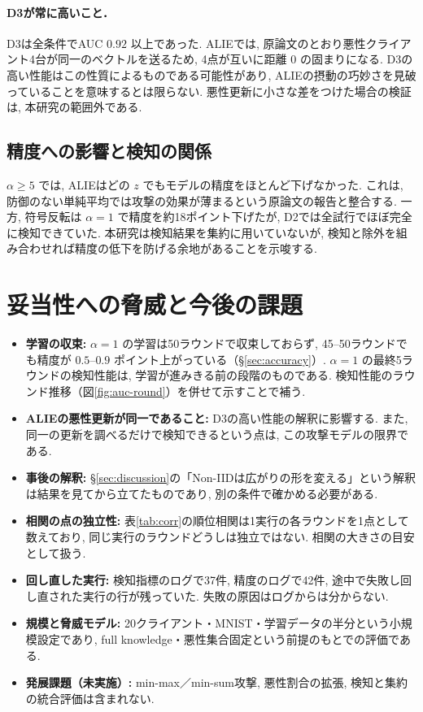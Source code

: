 \documentclass[a4j, twocolumn, dvipdfmx]{jsarticle}
\begin{document}
\paragraph{D3が常に高いこと．}
D3は全条件でAUC $0.92$ 以上であった. ALIEでは, 原論文のとおり悪性クライアント4台が同一のベクトルを送るため, 4点が互いに距離 $0$ の固まりになる. D3の高い性能はこの性質によるものである可能性があり, ALIEの摂動の巧妙さを見破っていることを意味するとは限らない. 悪性更新に小さな差をつけた場合の検証は, 本研究の範囲外である.

\subsection{精度への影響と検知の関係}

$\alpha \ge 5$ では, ALIEはどの $z$ でもモデルの精度をほとんど下げなかった. これは, 防御のない単純平均では攻撃の効果が薄まるという原論文\cite{baruch2019little}の報告と整合する. 一方, 符号反転は $\alpha=1$ で精度を約18ポイント下げたが, D2では全試行でほぼ完全に検知できていた. 本研究は検知結果を集約に用いていないが, 検知と除外を組み合わせれば精度の低下を防げる余地があることを示唆する.

\section{妥当性への脅威と今後の課題}

\begin{itemize}
  \item \textbf{学習の収束:} $\alpha=1$ の学習は50ラウンドで収束しておらず, 45--50ラウンドでも精度が $0.5$--$0.9$ ポイント上がっている（\S\ref{sec:accuracy}）. $\alpha=1$ の最終5ラウンドの検知性能は, 学習が進みきる前の段階のものである. 検知性能のラウンド推移（図\ref{fig:auc-round}）を併せて示すことで補う.
  \item \textbf{ALIEの悪性更新が同一であること:} D3の高い性能の解釈に影響する. また, 同一の更新を調べるだけで検知できるという点は, この攻撃モデルの限界である.
  \item \textbf{事後の解釈:} \S\ref{sec:discussion}の「Non-IIDは広がりの形を変える」という解釈は結果を見てから立てたものであり, 別の条件で確かめる必要がある.
  \item \textbf{相関の点の独立性:} 表\ref{tab:corr}の順位相関は1実行の各ラウンドを1点として数えており, 同じ実行のラウンドどうしは独立ではない. 相関の大きさの目安として扱う.
  \item \textbf{回し直した実行:} 検知指標のログで37件, 精度のログで42件, 途中で失敗し回し直された実行の行が残っていた. 失敗の原因はログからは分からない.
  \item \textbf{規模と脅威モデル:} 20クライアント・MNIST・学習データの半分という小規模設定であり, full knowledge・悪性集合固定という前提のもとでの評価である.
  \item \textbf{発展課題（未実施）:} min-max／min-sum攻撃, 悪性割合の拡張, 検知と集約の統合評価は含まれない.
\end{itemize}
\end{document}
